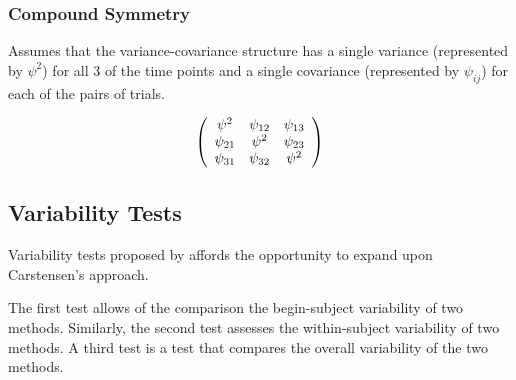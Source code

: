\documentclass[12pt, a4paper]{report}
\theoremstyle{plain}
\theoremstyle{definition}
\theoremstyle{remark}
\begin{document}
	
	
	\subsubsection{Compound Symmetry}
	
	Assumes that the variance-covariance structure has a single variance (represented by $\psi^2$)
	for all 3 of the time points and a single covariance (represented by $\psi_{ij}$) for each of the pairs of trials.
	
	\[
	\left(%
	\begin{array}{c c c}
	\psi^2 &  \psi_{12} & \psi_{13}   \\
	\psi_{21} & \psi^2 & \psi_{23}   \\
	\psi_{31} & \psi_{32} & \psi^2   \\
	\end{array}%
	\right)
	\]
	
	
	
	
	
	
	
	
	
	
	\subsection{Variability Tests}
	
		Variability tests proposed by \citet{ARoy2009} affords the opportunity to expand upon Carstensen's approach.
		
		The first test allows of the comparison the begin-subject variability of two methods. Similarly, the second test
		assesses the within-subject variability of two methods. A third test is a test that compares the overall variability of the two methods.
		
\end{document}
